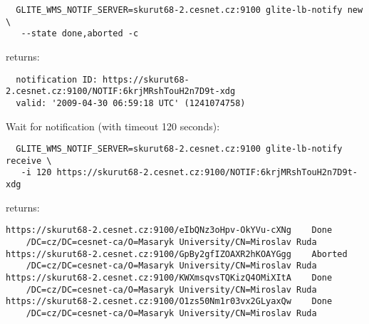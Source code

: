 \begin{verbatim}
  GLITE_WMS_NOTIF_SERVER=skurut68-2.cesnet.cz:9100 glite-lb-notify new \
   --state done,aborted -c
\end{verbatim}

returns:

\begin{verbatim}
  notification ID: https://skurut68-2.cesnet.cz:9100/NOTIF:6krjMRshTouH2n7D9t-xdg 
  valid: '2009-04-30 06:59:18 UTC' (1241074758)	
\end{verbatim}

Wait for notification (with timeout 120 seconds):
\begin{verbatim}
  GLITE_WMS_NOTIF_SERVER=skurut68-2.cesnet.cz:9100 glite-lb-notify receive \
   -i 120 https://skurut68-2.cesnet.cz:9100/NOTIF:6krjMRshTouH2n7D9t-xdg 
\end{verbatim}

returns:
\begin{verbatim}
https://skurut68-2.cesnet.cz:9100/eIbQNz3oHpv-OkYVu-cXNg	Done
    /DC=cz/DC=cesnet-ca/O=Masaryk University/CN=Miroslav Ruda
https://skurut68-2.cesnet.cz:9100/GpBy2gfIZOAXR2hKOAYGgg	Aborted
    /DC=cz/DC=cesnet-ca/O=Masaryk University/CN=Miroslav Ruda
https://skurut68-2.cesnet.cz:9100/KWXmsqvsTQKizQ4OMiXItA	Done
    /DC=cz/DC=cesnet-ca/O=Masaryk University/CN=Miroslav Ruda
https://skurut68-2.cesnet.cz:9100/O1zs50Nm1r03vx2GLyaxQw	Done
    /DC=cz/DC=cesnet-ca/O=Masaryk University/CN=Miroslav Ruda
\end{verbatim}

